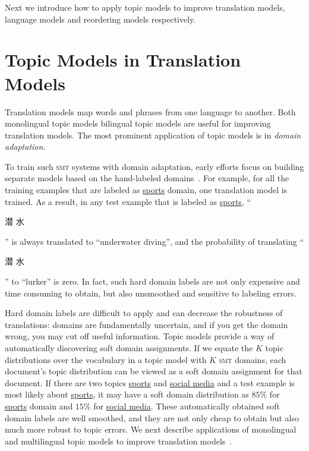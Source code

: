 Next we introduce how to apply topic models to improve translation
models, language models and reordering models respectively.


\section{Topic Models in Translation Models}

Translation models map words and phrases from one language to another.
Both monolingual topic models bilingual topic models are useful for improving translation models.
The most prominent application of topic models is in {\em domain adaptation}.

To train such \textsc{smt} systems with domain adaptation, early
efforts focus on building separate models based on the hand-labeled
domains~\citep{foster-07,matsoukas-09,chiang-11}. For example, for all
the training examples that are labeled as \underline{sports} domain,
one translation model is trained. As a result, in any test example
that is labeled as \underline{sports}, ``\begin{CJK*}{UTF8}{gbsn}潜
  水\end{CJK*}'' is always translated to ``underwater diving'', and
  the probability of translating ``\begin{CJK*}{UTF8}{gbsn}潜
    水\end{CJK*}'' to ``lurker'' is zero. In fact, such hard domain
    labels are not only expensive and time consuming to obtain, but
    also unsmoothed and sensitive to labeling errors.

Hard domain labels are difficult to apply and can decrease the robustness of translations: domains are fundamentally uncertain, and if you get the domain wrong, you may cut off useful information.
Topic models provide a way of automatically discovering soft domain
assignments. 
If we equate the $K$ topic distributions over the vocabulary in a topic model with $K$ 
\textsc{smt} domains, each document's topic distribution can be viewed as a soft
domain assignment for that document.
If there
are two topics \underline{sports} and \underline{social media} and
a test example is most likely about \underline{sports}, it may
have a soft domain distribution as $85\%$ for \underline{sports}
domain and $15\%$ for \underline{social media}. These automatically
obtained soft domain labels are well smoothed, and they are not only
cheap to obtain but also much more robust to topic errors. 
We next describe applications of monolingual and multilingual
topic models to improve translation models~\citep{Eidelman-12,hu-14}.

